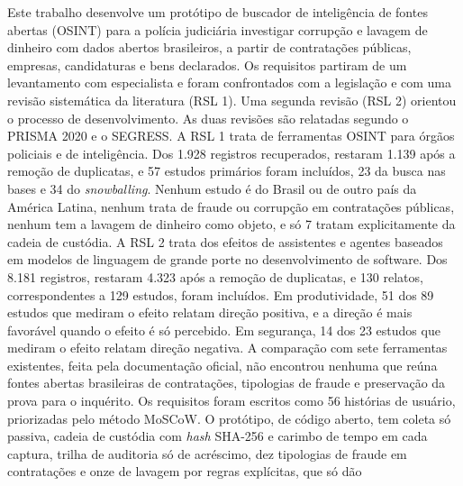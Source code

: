 \begin{resumo}
 Este trabalho desenvolve um protótipo de buscador de inteligência de fontes
 abertas (OSINT) para a polícia judiciária investigar corrupção e lavagem de
 dinheiro com dados abertos brasileiros, a partir de contratações públicas,
 empresas, candidaturas e bens declarados. Os requisitos partiram de um levantamento com
 especialista e foram confrontados com a legislação e com uma revisão
 sistemática da literatura (RSL 1). Uma segunda revisão (RSL 2) orientou o
 processo de desenvolvimento. As duas revisões são relatadas segundo o PRISMA
 2020 e o SEGRESS. A RSL 1 trata de ferramentas OSINT para órgãos policiais e
 de inteligência. Dos
 1.928 registros recuperados, restaram 1.139 após a remoção de duplicatas, e
 57 estudos primários foram incluídos, 23 da busca nas bases e 34 do
 \textit{snowballing}. Nenhum estudo é do Brasil ou de outro país da América
 Latina, nenhum trata de fraude ou corrupção em contratações públicas,
 nenhum tem a lavagem de dinheiro como objeto, e só 7 tratam explicitamente
 da cadeia de custódia. A RSL 2 trata dos
 efeitos de assistentes e agentes baseados em modelos de linguagem de grande
 porte no desenvolvimento de software. Dos 8.181 registros, restaram 4.323
 após a remoção de duplicatas, e 130 relatos, correspondentes a 129 estudos,
 foram incluídos. Em produtividade, 51 dos 89 estudos que mediram o efeito
 relatam direção positiva, e a direção é mais favorável quando o efeito é só
 percebido. Em segurança, 14 dos 23 estudos que mediram o efeito relatam
 direção negativa. A comparação com sete ferramentas existentes, feita pela
 documentação oficial, não encontrou nenhuma que reúna fontes abertas
 brasileiras de contratações, tipologias de fraude e preservação da prova
 para o inquérito. Os requisitos foram escritos como 56 histórias de usuário,
 priorizadas pelo método MoSCoW. O protótipo, de código aberto, tem coleta só
 passiva, cadeia de custódia com \textit{hash} SHA-256 e carimbo de tempo em
 cada captura, trilha de auditoria só de acréscimo, dez tipologias de fraude
 em contratações e onze de lavagem por regras explícitas, que só dão

\end{resumo}
